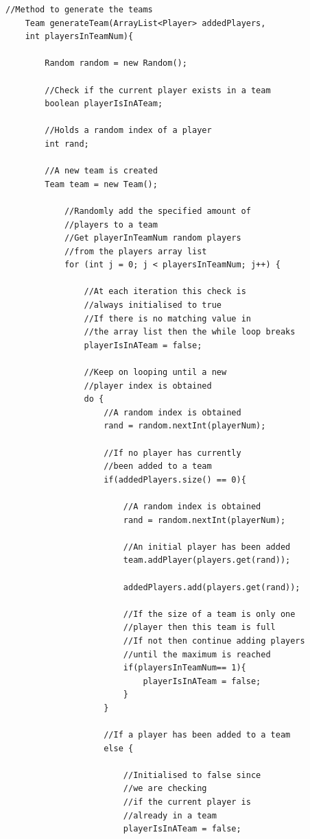 \documentclass[a4paper,12pt]{extarticle}
\begin{document}
\begin{lstlisting}
//Method to generate the teams
    Team generateTeam(ArrayList<Player> addedPlayers, 
    int playersInTeamNum){

        Random random = new Random();

        //Check if the current player exists in a team
        boolean playerIsInATeam;

        //Holds a random index of a player
        int rand;

        //A new team is created
        Team team = new Team();

            //Randomly add the specified amount of 
            //players to a team
            //Get playerInTeamNum random players 
            //from the players array list
            for (int j = 0; j < playersInTeamNum; j++) {

                //At each iteration this check is 
                //always initialised to true
                //If there is no matching value in 
                //the array list then the while loop breaks
                playerIsInATeam = false;

                //Keep on looping until a new 
                //player index is obtained
                do {
                    //A random index is obtained
                    rand = random.nextInt(playerNum);

                    //If no player has currently 
                    //been added to a team
                    if(addedPlayers.size() == 0){

                        //A random index is obtained
                        rand = random.nextInt(playerNum);

                        //An initial player has been added
                        team.addPlayer(players.get(rand));

                        addedPlayers.add(players.get(rand));

                        //If the size of a team is only one 
                        //player then this team is full
                        //If not then continue adding players 
                        //until the maximum is reached
                        if(playersInTeamNum== 1){
                            playerIsInATeam = false;
                        }
                    }

                    //If a player has been added to a team
                    else {

                        //Initialised to false since 
                        //we are checking 
                        //if the current player is 
                        //already in a team
                        playerIsInATeam = false;


\end{lstlisting}
\end{document}
